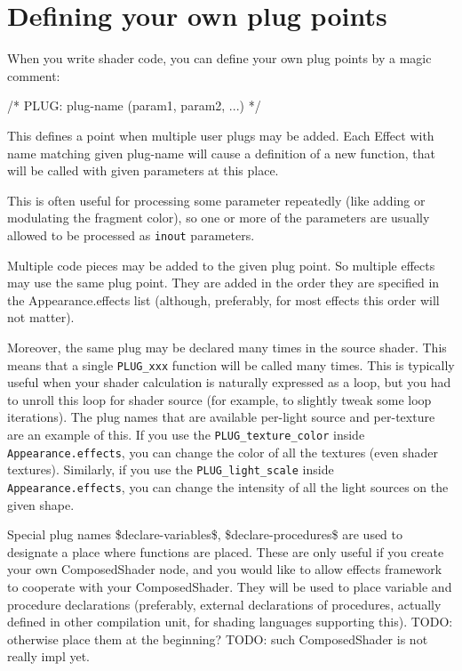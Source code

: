\documentclass{acmsiggraph}                     %
\newenvironment{mycode}
{\begin{mycodecore}}
{\end{mycodecore}
\vspace{-0.1in}}
\begin{document}
\section{Defining your own plug points}

When you write shader code, you can define your own plug points by a
magic comment:

\begin{mycode}
/* PLUG: plug-name (param1, param2, ...) */
\end{mycode}

This defines a point when multiple user plugs may be added. Each
Effect with name matching given plug-name will cause a
definition of a new function, that will be called with given parameters
at this place.

This is often useful for processing some parameter
repeatedly (like adding or modulating the fragment color),
so one or more of the parameters are usually allowed to be processed
as \texttt{inout} parameters.

Multiple code pieces may be added to the given plug point.
So multiple effects may use the same plug point. They are added
in the order they are specified in the Appearance.effects list
(although, preferably, for most effects this order will not matter).

Moreover, the same plug may be declared many times in the source shader.
This means that a single \texttt{PLUG\_xxx} function will be called
many times. This is typically useful when your shader calculation is naturally
expressed as a loop, but you had to unroll this loop for shader source
(for example, to slightly tweak some loop iterations).
The plug names that are available per-light source and per-texture
are an example of this. If you use the \texttt{PLUG\_texture\_color}
inside \texttt{Appearance.effects}, you can change the color of all
the textures (even shader textures).
Similarly, if you use the \texttt{PLUG\_light\_scale}
inside \texttt{Appearance.effects}, you can change the intensity
of all the light sources on the given shape.

Special plug names \$declare-variables\$, \$declare-procedures\$
are used to designate a place where functions are placed.
These are only useful if you create your own ComposedShader node,
and you would like to allow effects framework to cooperate with
your ComposedShader. They will be used to place
variable and procedure declarations (preferably, external declarations
of procedures, actually defined in other compilation unit,
for shading languages supporting this).
TODO: otherwise place them at the beginning?
TODO: such ComposedShader is not really impl yet.
\end{document}
